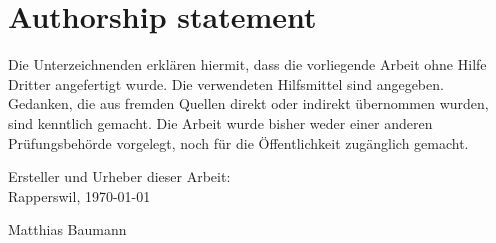 
\section*{Authorship statement}

Die Unterzeichnenden erklären hiermit, dass die vorliegende Arbeit ohne Hilfe Dritter
angefertigt wurde. Die verwendeten Hilfsmittel sind angegeben. Gedanken, die aus
fremden Quellen direkt oder indirekt übernommen wurden, sind kenntlich gemacht. Die
Arbeit wurde bisher weder einer anderen Prüfungsbehörde vorgelegt, noch für die
Öffentlichkeit zugänglich gemacht.

\vspace{2cm}
Ersteller und Urheber dieser Arbeit:\\
Rapperswil, \today

\vspace{6cm}

Matthias Baumann
